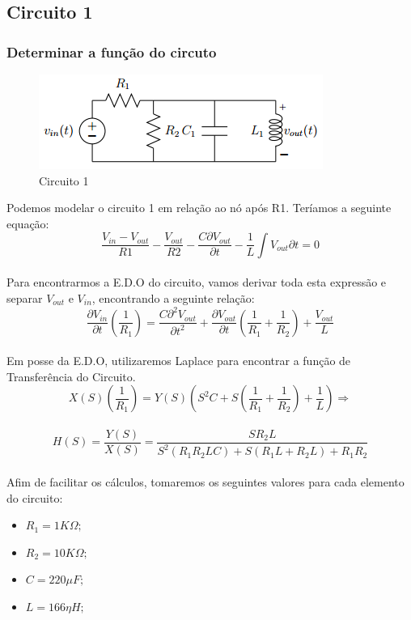 \documentclass[a4paper, 12pt]{article}
\begin{document}
		\subsection{Circuito 1}

			\subsubsection{Determinar a função do circuto}
			\begin{figure}[!ht]
				\centering
				\includegraphics{img/circuito1.png}
				\caption{Circuito 1}
			\end{figure}
			Podemos modelar o circuito 1 em relação ao nó após R1. Teríamos a seguinte equação: \\
			\[
				\frac{V_{in} - V_{out}}{R1} - \frac{V_{out}}{R2} - \frac{C\partial V_{out}}{\partial t} - \frac{1}{L} \int V_{out}{\partial t} = 0
			\] 	\\
			Para encontrarmos a E.D.O do circuito, vamos derivar toda esta expressão e separar $V_{out}$ e $V_{in}$, encontrando a seguinte relação:
			\[
				\frac{\partial V_{in}}{\partial t} \left(\frac{1}{R_{1}}\right) = \frac{C \partial^{2} V_{out}}{\partial t^{2}} + \frac{\partial V_{out}}{\partial t} \left(\frac{1}{R_{1}} + \frac{1}{R_{2}} \right) + \frac{V_{out}}{L}
			\] 	\\
			Em posse da E.D.O, utilizaremos Laplace para encontrar a função de Transferência do Circuito.
			\[
				X(S) \left(\frac{1}{R_{1}}\right) = Y(S)\left(S^{2}C + S \left(\frac{1}{R_{1}} + \frac{1}{R_{2}}\right) + \frac{1}{L} \right) \Rightarrow
			\] 	\\
			\[
				H(S) = \frac{Y(S)}{X(S)} = \frac{SR_{2}L}{S^{2}\left(R_{1}R_{2}LC\right) + S\left(R_{1}L + R_{2}L\right) + R_{1}R_{2}}
			\] 	\\

			Afim de facilitar os cálculos, tomaremos os seguintes valores para cada elemento do circuito:
			 \begin{itemize}
				\item $R_{1} = 1K \Omega;$
				\item $R_{2} = 10K \Omega;$
				\item $C = 220\mu F;$
				\item $L = 166\eta H;$
			 \end{itemize}
\end{document}
